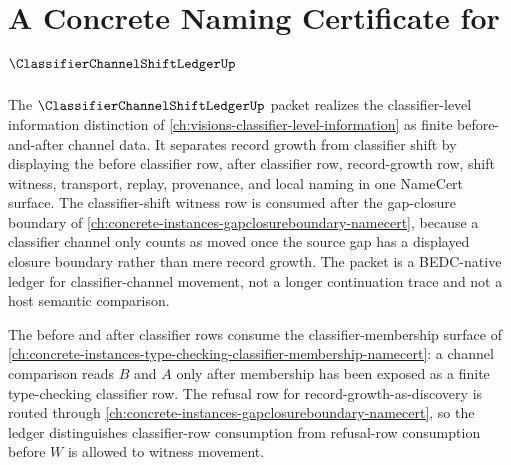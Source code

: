 \chapter{A Concrete Naming Certificate for $\ClassifierChannelShiftLedgerUp$}
\label{ch:concrete-instances-classifier-channel-shift-ledger-namecert}

The $\ClassifierChannelShiftLedgerUp$ packet realizes the classifier-level information distinction of \autoref{ch:visions-classifier-level-information} as finite before-and-after channel data. It separates record growth from classifier shift by displaying the before classifier row, after classifier row, record-growth row, shift witness, transport, replay, provenance, and local naming in one NameCert surface. The classifier-shift witness row is consumed after the gap-closure boundary of \autoref{ch:concrete-instances-gapclosureboundary-namecert}, because a classifier channel only counts as moved once the source gap has a displayed closure boundary rather than mere record growth. The packet is a BEDC-native ledger for classifier-channel movement, not a longer continuation trace and not a host semantic comparison.

The before and after classifier rows consume the classifier-membership surface of \autoref{ch:concrete-instances-type-checking-classifier-membership-namecert}: a channel comparison reads $B$ and $A$ only after membership has been exposed as a finite type-checking classifier row. The refusal row for record-growth-as-discovery is routed through \autoref{ch:concrete-instances-gapclosureboundary-namecert}, so the ledger distinguishes classifier-row consumption from refusal-row consumption before $W$ is allowed to witness movement.

